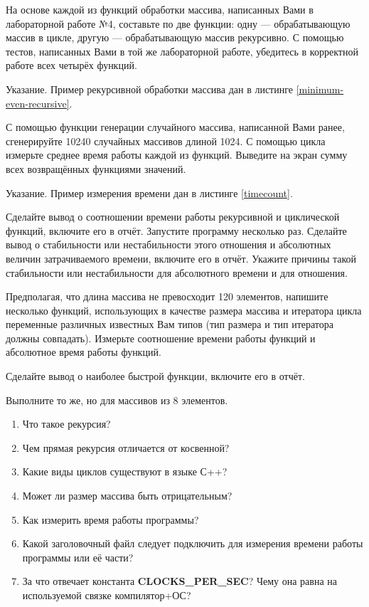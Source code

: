 
\labtask

На основе каждой из функций обработки массива, написанных Вами в лабораторной работе №4, составьте по две функции:
одну --- обрабатывающую массив в цикле, другую --- обрабатывающую массив рекурсивно.
С помощью тестов, написанных Вами в той же лабораторной работе, убедитесь в корректной работе всех четырёх функций.

Указание. Пример рекурсивной обработки массива дан в листинге \ref{minimum-even-recursive}.

\labtask

С помощью функции генерации случайного массива, написанной Вами ранее, сгенерируйте 10240 случайных массивов длиной 1024.
С помощью цикла измерьте среднее время работы каждой из функций.
Выведите на экран сумму всех возвращённых функциями значений.

Указание. Пример измерения времени дан в листинге \ref{timecount}.

Сделайте вывод о соотношении времени работы рекурсивной и циклической функций, включите его в отчёт.
Запустите программу несколько раз.
Сделайте вывод о стабильности или нестабильности этого отношения и абсолютных величин затрачиваемого времени, включите его в отчёт.
Укажите причины такой стабильности или нестабильности для абсолютного времени и для отношения.

\labtask

Предполагая, что длина массива не превосходит 120 элементов, напишите несколько функций, использующих в качестве размера массива и итератора цикла переменные различных известных Вам типов (тип размера и тип итератора должны совпадать).
Измерьте соотношение времени работы функций и абсолютное время работы функций.

Сделайте вывод о наиболее быстрой функции, включите его в отчёт.

\labtask

Выполните то же, но для массивов из 8 элементов.

\labworkquestions
\begin{enumerate}
	\item
		Что такое рекурсия?
	\item
		Чем прямая рекурсия отличается от косвенной?
	\item
		Какие виды циклов существуют в языке С++?
	\item
		Может ли размер массива быть отрицательным?
	\item
		Как измерить время работы программы?
	\item
		Какой заголовочный файл следует подключить для измерения времени работы программы или её части?
	\item
		За что отвечает константа \textbf{CLOCKS\_PER\_SEC}?
		Чему она равна на используемой связке компилятор+ОС?
\end{enumerate}

